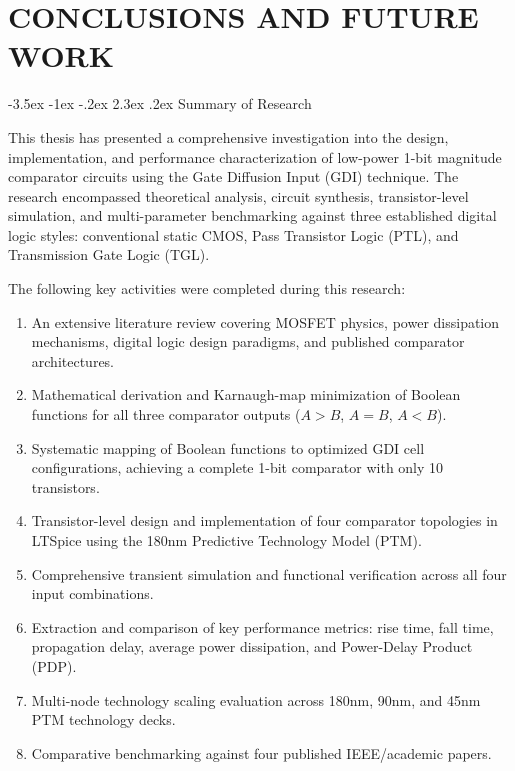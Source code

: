 \documentclass[12pt,a4paper,oneside]{report}
\makeatletter
\renewcommand\section{\@startsection {section}{1}{\z@}%
                                   {-3.5ex \@plus -1ex \@minus -.2ex}%
                                   {2.3ex \@plus.2ex}%
                                   {\normalfont\normalsize\bfseries}}
\makeatother
\begin{document}
\clearpage


\chapter{CONCLUSIONS AND FUTURE WORK}

\section{Summary of Research}

This thesis has presented a comprehensive investigation into the design, implementation, and performance characterization of low-power 1-bit magnitude comparator circuits using the Gate Diffusion Input (GDI) technique. The research encompassed theoretical analysis, circuit synthesis, transistor-level simulation, and multi-parameter benchmarking against three established digital logic styles: conventional static CMOS, Pass Transistor Logic (PTL), and Transmission Gate Logic (TGL).

The following key activities were completed during this research:
\begin{enumerate}
\item An extensive literature review covering MOSFET physics, power dissipation mechanisms, digital logic design paradigms, and published comparator architectures.
\item Mathematical derivation and Karnaugh-map minimization of Boolean functions for all three comparator outputs ($A>B$, $A=B$, $A<B$).
\item Systematic mapping of Boolean functions to optimized GDI cell configurations, achieving a complete 1-bit comparator with only 10 transistors.
\item Transistor-level design and implementation of four comparator topologies in LTSpice using the 180nm Predictive Technology Model (PTM).
\item Comprehensive transient simulation and functional verification across all four input combinations.
\item Extraction and comparison of key performance metrics: rise time, fall time, propagation delay, average power dissipation, and Power-Delay Product (PDP).
\item Multi-node technology scaling evaluation across 180nm, 90nm, and 45nm PTM technology decks.
\item Comparative benchmarking against four published IEEE/academic papers.
\end{enumerate}
\end{document}
